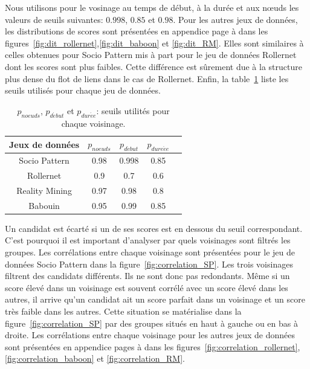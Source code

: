 
Nous utilisons pour le vosinage au temps de début, à la durée et aux n\oe uds les valeurs de seuils suivantes: $0.998$, $0.85$ et $0.98$.
Pour les autres jeux de données, les distributions de scores sont présentées en appendice page \pageref{fig:dit_rollernet} à \pageref{fig:dit_RM} dans les figures~\ref{fig:dit_rollernet},\ref{fig:dit_baboon} et \ref{fig:dit_RM}.
Elles sont similaires à celles obtenues pour Socio Pattern mis à part pour le jeu de données Rollernet dont les scores sont plus faibles.
Cette différence est sûrement due à la structure plus dense du flot de liens dans le cas de Rollernet.
Enfin, la table~\ref{tab:thresholds} liste les seuils utilisés pour chaque jeu de données.
\begin{table}
\centering
\begin{tabular}{|c|c|c|c|c|}
\hline \rule[-1ex]{0pt}{3.5ex}
Jeux de données & $p_{noeuds}$ & $p_{d\acute{e}but}$  & $p_{dure\acute{e}e}$  \\
\hline
Socio Pattern & 0.98 & 0.998 & 0.85 \\
Rollernet& 0.9 & 0.7 & 0.6 \\
Reality Mining & 0.97  & 0.98 & 0.8 \\
Babouin & 0.95  &  0.99  & 0.85 \\
\hline
\end{tabular}
\caption{$p_{noeuds}$, $p_{d\acute{e}but}$ et  $p_{dur\acute{e}e}$: seuils utilités pour chaque voisinage.}
\label{tab:thresholds}       %
\end{table}

Un candidat est écarté si un de ses scores est en dessous du seuil correspondant. 
C'est pourquoi il est important d'analyser par quels voisinages sont filtrés les groupes.
Les corrélations entre chaque voisinage sont présentées pour le jeu de données Socio Pattern dans la figure~\ref{fig:correlation_SP}.
Les trois voisinages filtrent des candidats différents.
Ils ne sont donc pas redondants.
Même si un score élevé dans un voisinage est souvent corrélé avec un score élevé dans les autres, il arrive qu'un candidat ait un score parfait dans un voisinage et un score très faible dans les autres.
Cette situation se matérialise dans la figure~\ref{fig:correlation_SP} par des groupes situés en haut à gauche ou en bas à droite.
Les corrélations entre chaque voisinage pour les autres jeux de données sont présentées en appendice pages \pageref{fig:correlation_rollernet} à \pageref{fig:correlation_RM} dans les figures~\ref{fig:correlation_rollernet},\ref{fig:correlation_baboon} et \ref{fig:correlation_RM}.


